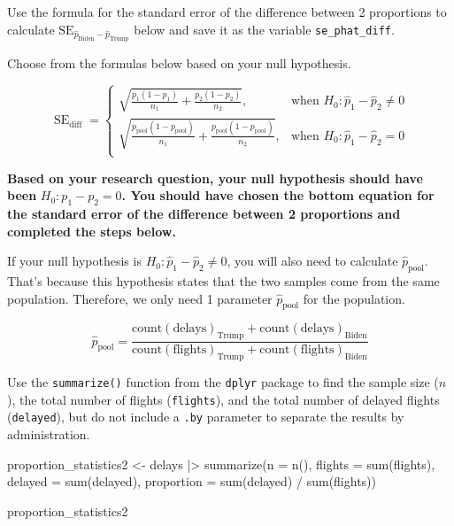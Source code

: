 \documentclass[
  letterpaper,
  DIV=11,
  numbers=noendperiod]{scrartcl}
\newenvironment{Shaded}{\begin{snugshade}}{\end{snugshade}}
\newcommand{\AttributeTok}[1]{\textcolor[rgb]{0.40,0.45,0.13}{#1}}
\newcommand{\FunctionTok}[1]{\textcolor[rgb]{0.28,0.35,0.67}{#1}}
\newcommand{\NormalTok}[1]{\textcolor[rgb]{0.00,0.23,0.31}{#1}}
\newcommand{\OtherTok}[1]{\textcolor[rgb]{0.00,0.23,0.31}{#1}}
\newcommand{\SpecialCharTok}[1]{\textcolor[rgb]{0.37,0.37,0.37}{#1}}
\begin{document}
Use the formula for the standard error of the difference between 2
proportions to calculate
\(\text{SE}_{\hat{p}_{\text{Biden}}-\hat{p}_{\text{Trump}}}\) below and
save it as the variable \texttt{se\_phat\_diff}.

Choose from the formulas below based on your null hypothesis.

\[
\operatorname{SE}_{\text{diff}}=
\begin{cases}
\sqrt{\frac{p_1(1-p_1)}{n_1} + \frac{p_2(1-p_2)}{n_2}}, & \text{when } H_0\colon \hat{p}_1-\hat{p}_2\ne 0 \\
\sqrt{\frac{p_{\text{pool}}(1-p_{\text{pool}})}{n_1} + \frac{p_{\text{pool}}(1-p_{\text{pool}})}{n_2}}, & \text{when } H_0\colon \hat{p}_1-\hat{p}_2 = 0 \\
\end{cases}
\]

\begin{tcolorbox}[enhanced jigsaw, toprule=.15mm, breakable, leftrule=.75mm, bottomrule=.15mm, rightrule=.15mm, colback=white, opacityback=0, colframe=quarto-callout-warning-color-frame, left=2mm, arc=.35mm]

\textbf{Based on your research question, your null hypothesis should
have been} \(H_0: p_1-p_2=0\)\textbf{. You should have chosen the bottom
equation for the standard error of the difference between 2 proportions
and completed the steps below.}

\end{tcolorbox}

If your null hypothesis is \(H_0\colon \hat{p}_1-\hat{p}_2\ne 0\), you
will also need to calculate \(\hat{p}_{\text{pool}}\). That's because
this hypothesis states that the two samples come from the same
population. Therefore, we only need 1 parameter
\(\hat{p}_{\text{pool}}\) for the population.

\[
\hat{p}_{\text{pool}}=\frac{\text{count}(\text{delays})_{\text{Trump}} + \text{count}(\text{delays})_{\text{Biden}}}{\text{count}(\text{flights})_{\text{Trump}} + \text{count}(\text{flights})_{\text{Biden}}}
\]

Use the \texttt{summarize()} function from the \texttt{dplyr} package to
find the sample size (\(n\)), the total number of flights
(\texttt{flights}), and the total number of delayed flights
(\texttt{delayed}), but do not include a \texttt{.by} parameter to
separate the results by administration.

\begin{Shaded}
\begin{Highlighting}[]
\NormalTok{proportion\_statistics2 }\OtherTok{\textless{}{-}}\NormalTok{ delays }\SpecialCharTok{|\textgreater{}}
  \FunctionTok{summarize}\NormalTok{(}\AttributeTok{n =} \FunctionTok{n}\NormalTok{(), }
            \AttributeTok{flights =} \FunctionTok{sum}\NormalTok{(flights), }
            \AttributeTok{delayed =} \FunctionTok{sum}\NormalTok{(delayed), }
            \AttributeTok{proportion =} \FunctionTok{sum}\NormalTok{(delayed) }\SpecialCharTok{/} \FunctionTok{sum}\NormalTok{(flights))}

\NormalTok{proportion\_statistics2}
\end{Highlighting}
\end{Shaded}
\end{document}

